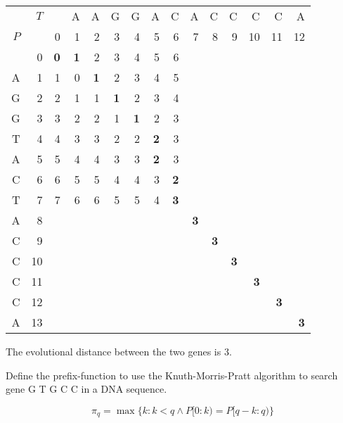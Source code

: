 \documentclass{cal}
\begin{document}
{\begin{center} \begin{tabular}{r r | rrrrrrrrrrrrr}
        & $T$ &    & A & A & G & G & A & C & A & C & C &  C &  C &  A \\
    $P$ &     &  0 & 1 & 2 & 3 & 4 & 5 & 6 & 7 & 8 & 9 & 10 & 11 & 12 \\ \hline
        &   0 &  \textbf{0} & \textbf{1} & 2 & 3 & 4 & 5 & 6 &   &   &   &    &    &    \\
    A   &   1 &  1 & 0 & \textbf{1} & 2 & 3 & 4 & 5 &   &   &   &    &    &    \\
    G   &   2 &  2 & 1 & 1 & \textbf{1} & 2 & 3 & 4 &   &   &   &    &    &    \\
    G   &   3 &  3 & 2 & 2 & 1 & \textbf{1} & 2 & 3 &   &   &   &    &    &    \\
    T   &   4 &  4 & 3 & 3 & 2 & 2 & \textbf{2} & 3 &   &   &   &    &    &    \\
    A   &   5 &  5 & 4 & 4 & 3 & 3 & \textbf{2} & 3 &   &   &   &    &    &    \\
    C   &   6 &  6 & 5 & 5 & 4 & 4 & 3 & \textbf{2} &   &   &   &    &    &    \\
    T   &   7 &  7 & 6 & 6 & 5 & 5 & 4 & \textbf{3} &   &   &   &    &    &    \\
    A   &   8 &    &   &   &   &   &   &   & \textbf{3} &   &   &    &    &    \\
    C   &   9 &    &   &   &   &   &   &   &   & \textbf{3} &   &    &    &    \\
    C   &  10 &    &   &   &   &   &   &   &   &   & \textbf{3} &    &    &    \\
    C   &  11 &    &   &   &   &   &   &   &   &   &   & \textbf{3} &    &    \\
    C   &  12 &    &   &   &   &   &   &   &   &   &   &    & \textbf{3} &    \\
    A   &  13 &    &   &   &   &   &   &   &   &   &   &    &    & \textbf{3} \\
\end{tabular} \end{center}

The evolutional distance between the two genes is 3.

\newpage
{}
Define the prefix-function to use the Knuth-Morris-Pratt algorithm to search gene G T G C C in a DNA sequence.

\ansseparator

\begin{equation*}
    \pi_q = \max \{k : k < q \wedge P[0:k) = P[q-k:q)\}
\end{equation*}

}
\end{document}
